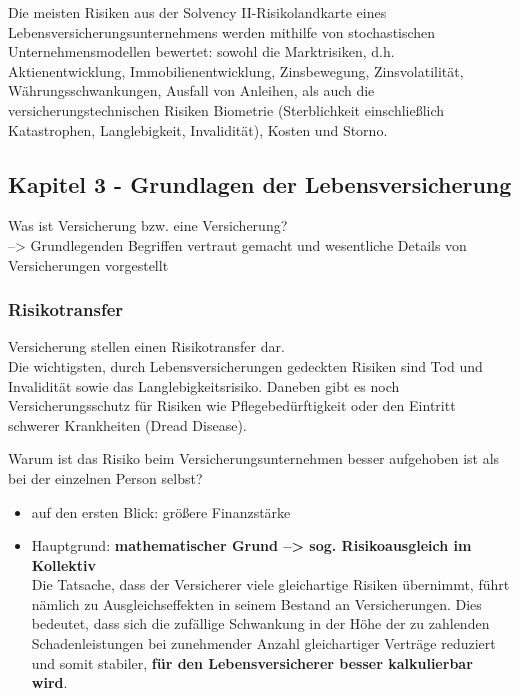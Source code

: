 \documentclass[
]{article}
\providecommand{\tightlist}{%
  \setlength{\itemsep}{0pt}\setlength{\parskip}{0pt}}
\begin{document}
Die meisten Risiken aus der Solvency II-Risikolandkarte eines
Lebensversicherungsunternehmens werden mithilfe von stochastischen
Unternehmensmodellen bewertet: sowohl die Marktrisiken, d.h.
Aktienentwicklung, Immobilienentwicklung, Zinsbewegung, Zinsvolatilität,
Währungsschwankungen, Ausfall von Anleihen, als auch die
versicherungstechnischen Risiken Biometrie (Sterblichkeit einschließlich
Katastrophen, Langlebigkeit, Invalidität), Kosten und Storno.

\hypertarget{kapitel-3---grundlagen-der-lebensversicherung}{%
\subsection{Kapitel 3 - Grundlagen der
Lebensversicherung}\label{kapitel-3---grundlagen-der-lebensversicherung}}

Was ist Versicherung bzw. eine Versicherung?\\
--\textgreater{} Grundlegenden Begriffen vertraut gemacht und
wesentliche Details von Versicherungen vorgestellt

\hypertarget{risikotransfer}{%
\subsubsection{Risikotransfer}\label{risikotransfer}}

Versicherung stellen einen Risikotransfer dar.\\
Die wichtigsten, durch Lebensversicherungen gedeckten Risiken sind Tod
und Invalidität sowie das Langlebigkeitsrisiko. Daneben gibt es noch
Versicherungsschutz für Risiken wie Pflegebedürftigkeit oder den
Eintritt schwerer Krankheiten (Dread Disease).

Warum ist das Risiko beim Versicherungsunternehmen besser aufgehoben ist
als bei der einzelnen Person selbst?

\begin{itemize}
\tightlist
\item
  auf den ersten Blick: größere Finanzstärke\\
\item
  Hauptgrund: \textbf{mathematischer Grund --\textgreater{} sog.
  Risikoausgleich im Kollektiv}\\
  Die Tatsache, dass der Versicherer viele gleichartige Risiken
  übernimmt, führt nämlich zu Ausgleichseffekten in seinem Bestand an
  Versicherungen. Dies bedeutet, dass sich die zufällige Schwankung in
  der Höhe der zu zahlenden Schadenleistungen bei zunehmender Anzahl
  gleichartiger Verträge reduziert und somit stabiler, \textbf{für den
  Lebensversicherer besser kalkulierbar wird}.
\end{itemize}
\end{document}
